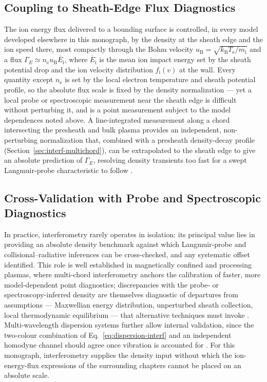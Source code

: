 \subsection{Coupling to Sheath-Edge Flux Diagnostics}

The ion energy flux delivered to a bounding surface is controlled, in every model developed elsewhere in this monograph, by the density at the sheath edge and the ion speed there, most compactly through the Bohm velocity $u_{\mathrm{B}} = \sqrt{k_{\mathrm{B}} T_{\mathrm{e}}/m_{\mathrm{i}}}$ and a flux $\Gamma_{E} \simeq n_{\mathrm{e}} u_{\mathrm{B}} \overline{E}_{\mathrm{i}}$, where $\overline{E}_{\mathrm{i}}$ is the mean ion impact energy set by the sheath potential drop and the ion velocity distribution $f_{\mathrm{i}}(v)$ at the wall. Every quantity except $n_{\mathrm{e}}$ is set by the local electron temperature and sheath potential profile, so the absolute flux scale is fixed by the density normalization — yet a local probe or spectroscopic measurement near the sheath edge is difficult without perturbing it, and is a point measurement subject to the model dependences noted above. A line-integrated measurement along a chord intersecting the presheath and bulk plasma provides an independent, non-perturbing normalization that, combined with a presheath density-decay profile (Section~\ref{sec:interf-multichord}), can be extrapolated to the sheath edge to give an absolute prediction of $\Gamma_{E}$, resolving density transients too fast for a swept Langmuir-probe characteristic to follow \cite{ref0399,ref0417}.

\subsection{Cross-Validation with Probe and Spectroscopic Diagnostics}

In practice, interferometry rarely operates in isolation: its principal value lies in providing an absolute density benchmark against which Langmuir-probe and collisional--radiative inferences can be cross-checked, and any systematic offset identified. This role is well established in magnetically confined and processing plasmas, where multi-chord interferometry anchors the calibration of faster, more model-dependent point diagnostics; discrepancies with the probe- or spectroscopy-inferred density are themselves diagnostic of departures from assumptions — Maxwellian energy distribution, unperturbed sheath collection, local thermodynamic equilibrium — that alternative techniques must invoke \cite{ref0399}. Multi-wavelength dispersion systems further allow internal validation, since the two-colour combination of Eq.~\eqref{eq:dispersion-interf} and an independent homodyne channel should agree once vibration is accounted for \cite{ref0417}. For this monograph, interferometry supplies the density input without which the ion-energy-flux expressions of the surrounding chapters cannot be placed on an absolute scale.

